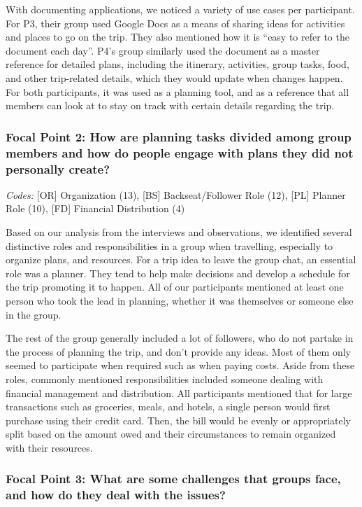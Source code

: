 \documentclass[12pt,a4paper]{article}
\begin{document}
With documenting applications, we noticed a variety of use cases per participant. For P3, their group used Google Docs as a means of sharing ideas for activities and places to go on the trip. They also mentioned how it is “easy to refer to the document each day”. P4’s group similarly used the document as a master reference for detailed plans, including the itinerary, activities, group tasks, food, and other trip-related details, which they would update when changes happen. For both participants, it was used as a planning tool, and as a reference that all members can look at to stay on track with certain details regarding the trip.

\subsubsection{Focal Point 2: How are planning tasks divided among group members and how do people engage with plans they did not personally create?}

\textit{Codes:} [OR] Organization (13), [BS] Backseat/Follower Role (12), [PL] Planner Role (10), [FD] Financial Distribution (4)
\vspace{6pt}

Based on our analysis from the interviews and observations, we identified several distinctive roles and responsibilities in a group when travelling, especially to organize plans, and resources. For a trip idea to leave the group chat, an essential role was a planner. They tend to help make decisions and develop a schedule for the trip promoting it to happen. All of our participants mentioned at least one person who took the lead in planning, whether it was themselves or someone else in the group.

\vspace{6pt}

The rest of the group generally included a lot of followers, who do not partake in the process of planning the trip, and don't provide any ideas. Most of them only seemed to participate when required such as when paying costs. Aside from these roles, commonly mentioned responsibilities included someone dealing with financial management and distribution. All participants mentioned that for large transactions such as groceries, meals, and hotels, a single person would first purchase using their credit card. Then, the bill would be evenly or appropriately split based on the amount owed and their circumstances to remain organized with their resources.

\subsubsection{Focal Point 3: What are some challenges that groups face, and how do they deal with the issues?}
\end{document}
